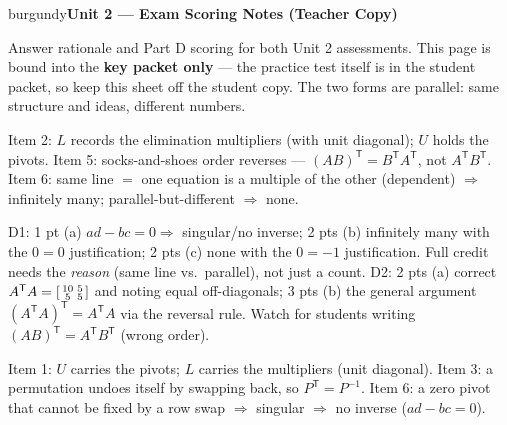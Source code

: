 \documentclass[10pt]{article}
\newcommand{\tp}{\mathsf{T}}
\begin{document}


\newpage
\begin{headlinebox}{burgundy}{\color{white}\bfseries Unit 2 --- Exam Scoring Notes (Teacher Copy)}\end{headlinebox}

\vspace{4pt}
\noindent\small
Answer rationale and Part D scoring for both Unit 2 assessments. This page is bound into the
\textbf{key packet only} --- the practice test itself is in the student packet, so keep this sheet
off the student copy. The two forms are parallel: same structure and ideas, different numbers.

\vspace{6pt}

\begin{teachernote}
Item 2: $L$ records the elimination multipliers (with unit diagonal); $U$ holds the pivots. Item 5:
socks-and-shoes order reverses --- $(AB)^{\tp}=B^{\tp}A^{\tp}$, not $A^{\tp}B^{\tp}$.
Item 6: same line $=$ one equation is a multiple of the other (dependent) $\Rightarrow$ infinitely many;
parallel-but-different $\Rightarrow$ none.
\end{teachernote}

\begin{teachernote}
D1: 1 pt (a) $ad-bc=0\Rightarrow$ singular/no inverse; 2 pts (b) infinitely many with the $0=0$
justification; 2 pts (c) none with the $0=-1$ justification. Full credit needs the \emph{reason}
(same line vs.\ parallel), not just a count. D2: 2 pts (a) correct
$A^{\tp}A=\begin{bsmallmatrix}10&5\\5&5\end{bsmallmatrix}$ and noting equal off-diagonals; 3 pts (b)
the general argument $(A^{\tp}A)^{\tp}=A^{\tp}A$ via the reversal rule. Watch for students
writing $(AB)^{\tp}=A^{\tp}B^{\tp}$ (wrong order).
\end{teachernote}

\begin{teachernote}
Item 1: $U$ carries the pivots; $L$ carries the multipliers (unit diagonal). Item 3: a permutation
undoes itself by swapping back, so $P^{\tp}=P^{-1}$. Item 6: a zero pivot that cannot be fixed by a
row swap $\Rightarrow$ singular $\Rightarrow$ no inverse ($ad-bc=0$).
\end{teachernote}
\end{document}
